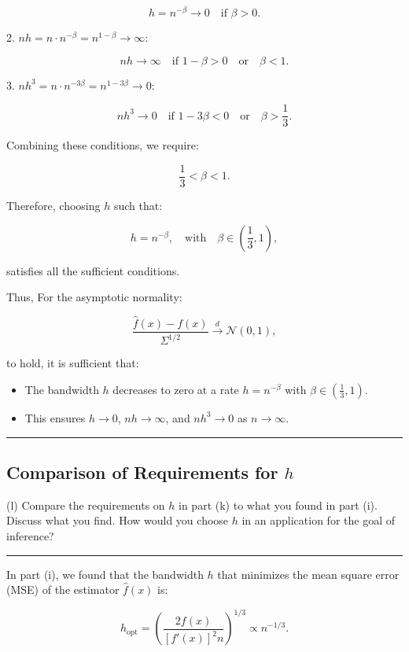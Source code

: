 \documentclass{article}
\newenvironment{colorparagraph}[1]{\par\color{#1}}{\par}
\begin{document}
\[
h = n^{-\beta} \to 0 \quad \text{if } \beta > 0.
\]

2. \( n h = n \cdot n^{-\beta} = n^{1 - \beta} \to \infty \):

\[
n h \to \infty \quad \text{if } 1 - \beta > 0 \quad \text{or} \quad \beta < 1.
\]

3. \( n h^3 = n \cdot n^{-3\beta} = n^{1 - 3\beta} \to 0 \):

\[
n h^3 \to 0 \quad \text{if } 1 - 3\beta < 0 \quad \text{or} \quad \beta > \frac{1}{3}.
\]

Combining these conditions, we require:

\[
\frac{1}{3} < \beta < 1.
\]

Therefore, choosing \( h \) such that:

\[
h = n^{-\beta}, \quad \text{with} \quad \beta \in \left( \frac{1}{3}, 1 \right),
\]

satisfies all the sufficient conditions.

Thus, For the asymptotic normality:

\[
\frac{\hat{f}(x) - f(x)}{\Sigma^{1/2}} \xrightarrow{d} \mathcal{N}(0, 1),
\]

to hold, it is sufficient that:

\begin{itemize}
    \item The bandwidth \( h \) decreases to zero at a rate \( h = n^{-\beta} \) with \( \beta \in \left( \frac{1}{3}, 1 \right) \).
    \item This ensures \( h \to 0 \), \( n h \to \infty \), and \( n h^3 \to 0 \) as \( n \to \infty \).
\end{itemize}

\begin{colorparagraph}{questioncolor}
\label{q2l}
\rule{\textwidth}{0.5pt}
\subsection{Comparison of Requirements for \( h \)}
(l) Compare the requirements on \( h \) in part (k) to what you found in part (i). Discuss what you find. How would you choose \( h \) in an application for the goal of inference?

\rule{\textwidth}{0.5pt}
\end{colorparagraph}

In part (i), we found that the bandwidth \( h \) that minimizes the mean square error (MSE) of the estimator \( \hat{f}(x) \) is:

\[
h_{\text{opt}} = \left( \frac{2 f(x)}{[f'(x)]^2 n} \right)^{1/3} \propto n^{-1/3}.
\]
\end{document}
